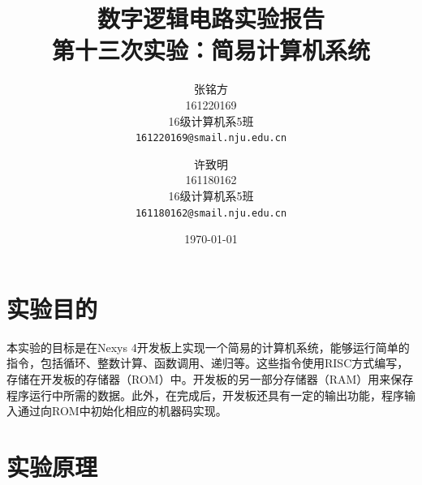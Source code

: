 \documentclass[titlepage, 11pt]{article}
\begin{document}
	\title{\vspace{-25mm}数字逻辑电路实验报告\\\vspace{15mm}\Huge\textbf{第十三次实验：简易计算机系统}\vspace{60mm}}
	\author{张铭方\\161220169\\16级计算机系5班\\\texttt{161220169@smail.nju.edu.cn}\and 许致明\\161180162\\16级计算机系5班\\\texttt{161180162@smail.nju.edu.cn}}\date{\vspace{30mm}\today}
	\maketitle
	\section{实验目的}
	本实验的目标是在Nexys 4开发板上实现一个简易的计算机系统，能够运行简单的指令，包括循环、整数计算、函数调用、递归等。这些指令使用RISC方式编写，存储在开发板的存储器（ROM）中。开发板的另一部分存储器（RAM）用来保存程序运行中所需的数据。此外，在完成后，开发板还具有一定的输出功能，程序输入通过向ROM中初始化相应的机器码实现。
	\section{实验原理}
\end{document}
